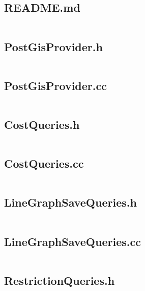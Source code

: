 \documentclass[../main.tex]{subfiles}
\begin{document}
\subsection{README.md}\label{lst:mapprovider-postgis-readme-md}
\inputminted[breaklines=true]{text}{parts/code/mapprovider/postgis/README.md}

\subsection{PostGisProvider.h}\label{lst:mapprovider-postgis-postgis-provider-h}
\inputminted[linenos=true]{cpp}{parts/code/mapprovider/postgis/PostGisProvider.h}

\subsection{PostGisProvider.cc}\label{lst:mapprovider-postgis-postgis-provider-cc}
\inputminted[linenos=true]{cpp}{parts/code/mapprovider/postgis/PostGisProvider.cc}

\subsection{CostQueries.h}\label{lst:mapprovider-postgis-cost-queries-h}
\inputminted[linenos=true]{cpp}{parts/code/mapprovider/postgis/CostQueries.h}

\subsection{CostQueries.cc}\label{lst:mapprovider-postgis-cost-queries-cc}
\inputminted[linenos=true]{cpp}{parts/code/mapprovider/postgis/CostQueries.cc}

\subsection{LineGraphSaveQueries.h}\label{lst:mapprovider-postgis-linegraph-save-queries-h}
\inputminted[linenos=true]{cpp}{parts/code/mapprovider/postgis/LineGraphSaveQueries.h}

\subsection{LineGraphSaveQueries.cc}\label{lst:mapprovider-postgis-linegraph-save-queries-cc}
\inputminted[linenos=true]{cpp}{parts/code/mapprovider/postgis/LineGraphSaveQueries.cc}

\subsection{RestrictionQueries.h}\label{lst:mapprovider-postgis-restriction-queries-h}
\inputminted[linenos=true]{cpp}{parts/code/mapprovider/postgis/RestrictionQueries.h}
\end{document}
